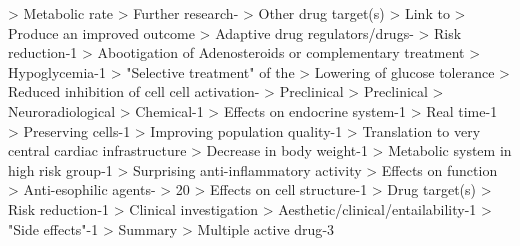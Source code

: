 \documentclass{article}%
\begin{document}
> Metabolic rate\newline%
> Further research{-}\newline%
> Other drug target(s)\newline%
> Link to\newline%
> Produce an improved outcome\newline%
> Adaptive drug regulators/drugs{-}\newline%
> Risk reduction{-}1\newline%
> Abootigation of Adenosteroids or complementary treatment\newline%
> Hypoglycemia{-}1\newline%
> "Selective treatment" of the\newline%
> Lowering of glucose tolerance\newline%
> Reduced inhibition of cell cell activation{-}\newline%
> Preclinical\newline%
> Preclinical\newline%
> Neuroradiological\newline%
> Chemical{-}1\newline%
> Effects on endocrine system{-}1\newline%
> Real time{-}1\newline%
> Preserving cells{-}1\newline%
> Improving population quality{-}1\newline%
> Translation to very central cardiac infrastructure\newline%
> Decrease in body weight{-}1\newline%
> Metabolic system in high risk group{-}1\newline%
> Surprising anti{-}inflammatory activity\newline%
> Effects on function\newline%
> Anti{-}esophilic agents{-}\newline%
> 20\newline%
> Effects on cell structure{-}1\newline%
> Drug target(s)\newline%
> Risk reduction{-}1\newline%
> Clinical investigation\newline%
> Aesthetic/clinical/entailability{-}1\newline%
> "Side effects"{-}1\newline%
> Summary\newline%
> Multiple active drug{-}3\newline%
\end{document}
